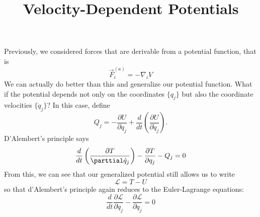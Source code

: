 \documentclass{article}
\title{Velocity-Dependent Potentials}
\begin{document}
Previously, we considered forces that are derivable from a potential function,
that is
\begin{equation}
  \vec{F}_i^{(a)} = -\nabla_iV
\end{equation}
We can actually do better than this and generalize our potential function. What
if the potential depends not only on the coordinates $\{q_j\}$ but also the
coordinate velocities $\{\dot{q}_j\}$? In this case, define
\begin{equation}
  Q_j = -\frac{\partial U}{\partial q_j}+\frac{d}{dt}\left( \frac{\partial U}{\partial \dot{q}_j} \right).
\end{equation}
D'Alembert's principle says
\begin{equation}
  \frac{d}{dt}\left( \frac{\partial T}{\parttial \dot{q}_j} \right)-\frac{\partial T}{\partial q_j}-Q_j = 0
\end{equation}
From this, we can see that our generalized potential still allows us to write
\begin{equation}
  \mathcal{L}= T-U
\end{equation}
so that d'Alembert's principle again reduces to the Euler-Lagrange equations:
\begin{equation}
  \frac{d}{dt}\frac{\partial \mathcal{L}}{\partial \dot{q}_j}-\frac{\partial \mathcal{L}}{\partial q_j} = 0 
\end{equation}
\end{document}
